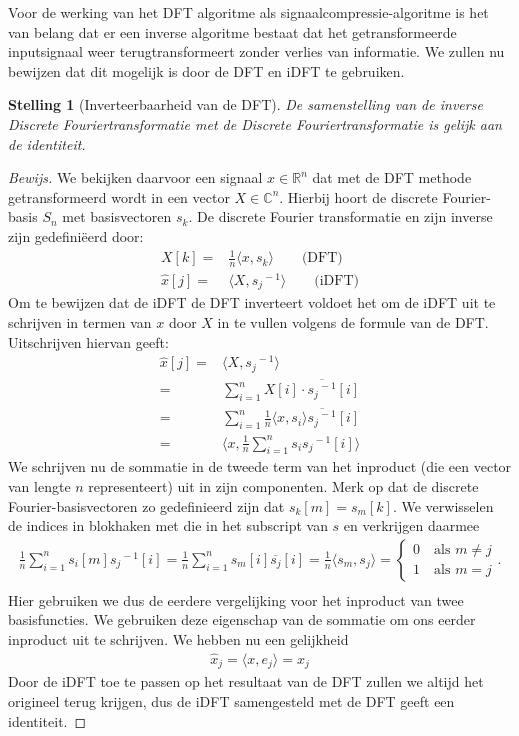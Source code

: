 \documentclass[11pt]{report}
\newcommand{\R}{\mathbb{R}}
\newcommand{\C}{\mathbb{C}}
\theoremstyle{plain}
\newtheorem*{stelling}{Stelling}
\theoremstyle{remark}
\newcommand{\eq}[1]{\begin{eqnarray*} #1 \end{eqnarray*}}
\newcommand{\repr}[1]{{#1}^{\!\!-1}}
\newcommand{\inpr}[2]{\langle #1 , #2 \rangle}
\begin{document}
Voor de werking van het DFT algoritme als signaalcompressie-algoritme is het van belang dat er een 
inverse algoritme bestaat dat het getransformeerde inputsignaal weer terugtransformeert 
zonder verlies van informatie. We zullen nu bewijzen dat dit mogelijk is door de DFT en iDFT te gebruiken.

\begin{stelling}[Inverteerbaarheid van de DFT]
  De samenstelling van de inverse Discrete Fouriertransformatie met de Discrete Fouriertransformatie is
  gelijk aan de identiteit.
\end{stelling}
\begin{proof}[Bewijs]
We bekijken daarvoor een signaal $x\in\R^n$ dat met de DFT methode getransformeerd wordt in een vector $X\in\C^n$.
Hierbij hoort de discrete Fourier-basis $S_n$ met basisvectoren $s_k$. 
De discrete Fourier transformatie en zijn inverse zijn gedefini\"eerd door:
\eq{
  X[k]      =& \tfrac 1 n \langle x, s_k \rangle \quad\quad \text{(DFT)}\\
  \hat x[j] =&  \langle X, \repr{s_j} \rangle \quad\quad\text{(iDFT)}
}
Om te bewijzen dat de iDFT de DFT inverteert voldoet het om de iDFT uit te schrijven in termen van $x$ 
door $X$ in te vullen volgens de formule van de DFT. Uitschrijven hiervan geeft:
\eq{
  \hat x[j] =&  \langle X , \repr{s_j} \rangle \\
      =&  \sum_{i=1}^n X[i]\cdot \overline{\repr{s_j}}[i] \\
      =&  \sum_{i=1}^n \tfrac1n\inpr{x}{s_i} \overline{\repr{s_j}}[i] \\
      =& \langle x , \frac1n \sum_{i=1}^n s_i \repr{s_j}[i] \rangle
}
We schrijven nu de sommatie in de tweede term van het inproduct (die een vector van lengte $n$ representeert) uit in zijn componenten. 
Merk op dat de discrete Fourier-basisvectoren zo gedefinieerd zijn dat $s_k[m] = s_m[k]$. 
We verwisselen de indices in blokhaken met die in het subscript van $s$ en verkrijgen daarmee
\eq{
  \frac1n \sum_{i=1}^n s_i[m] \repr{s_j}[i] = \frac1n \sum_{i=1}^n s_m[i] \overline{s_j}[i] 
=\tfrac1n \inpr{s_m}{s_j} = \begin{cases}0\quad\text{als }m\neq j\\1\quad\text{als }m=j\end{cases}.\\
}
Hier gebruiken we dus de eerdere vergelijking voor het inproduct van twee basisfuncties.
We gebruiken deze eigenschap van de sommatie om ons eerder inproduct uit te schrijven. 
We hebben nu een gelijkheid
\eq{
  \hat x_j = \inpr{x}{e_j} = x_j
}
Door de iDFT toe te passen op het resultaat van de DFT zullen we altijd het origineel terug krijgen,
dus de iDFT samengesteld met de DFT geeft een identiteit.
\end{proof}
\end{document}
